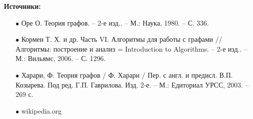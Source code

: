 \documentclass[10pt,a4paper,twocolumn]{article}
\begin{document}
\large{\textbf{Источники:}}
\begin{enumerate}
	\item[$\bullet$] Оре О. Теория графов. – 2-е изд.. – М.: Наука, 1980. – С. 336.
	\item[$\bullet$] Кормен Т. Х. и др. Часть VI. Алгоритмы для работы с графами // Алгоритмы: построение и анализ = Introduction to Algorithms. – 2-е изд.. – М.: Вильямс, 2006. – С. 1296.
	\item[$\bullet$] Харари, Ф. Теория графов / Ф. Харари / Пер. с англ. и предисл. В.П. Козырева. Под ред. Г.П. Гаврилова. Изд. 2-е. – М.: Едиториал УРСС, 2003. – 269 с.
    \item[$\bullet$]  wikipedia.org
\end{enumerate}
\end{document}
